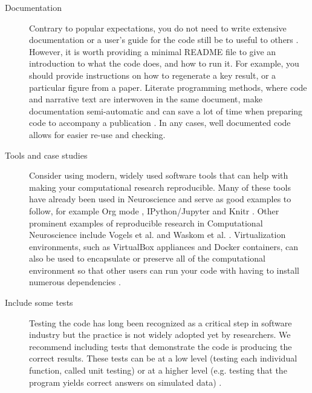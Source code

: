 \documentclass[11pt]{article}
\begin{document}
\begin{description}
\item [Documentation] Contrary to popular expectations, you do not
  need to write extensive documentation or a user's guide for the code
  still be to useful to others \cite{Barnes2010-iv}.  However, it is
  worth providing a minimal README file to give an introduction to
  what the code does, and how to run it.  For example, you should provide
  instructions on how to regenerate a key result, or a particular
  figure from a paper. Literate programming methods, where code and narrative text are interwoven in the same document, make documentation semi-automatic and can save a lot of time when preparing code to accompany a publication \cite{schulte2012multi, gentleman2012statistical}. In any cases, well documented code allows for easier re-use and checking.

\item [Tools and case studies] Consider using modern, widely used software tools that can help with making your computational research reproducible.  Many of
  these tools have already been used in Neuroscience and serve as good
  examples to follow, for example Org mode \cite{Delescluse2011},
  IPython/Jupyter \cite{Stevens2013} and Knitr \cite{Eglen2014}.  Other
  prominent examples of reproducible research in Computational
  Neuroscience include Vogels et al. \cite{Vogels2011-c8c} and Waskom et al. \cite{Waskom2014-gd}.
  Virtualization environments, such as VirtualBox appliances and
  Docker containers, can also be used to
  encapsulate or preserve all of the computational environment so that
  other users can run your code with having to install numerous dependencies \cite{Boettiger2015}.

\item [Include some tests] Testing the code has long been recognized
  as a critical step in software industry but the practice is not
  widely adopted yet by researchers. We recommend including tests that
  demonstrate the code is producing the correct
  results\cite{Axelrod2014-xi}. These tests can be at a low level
  (testing each individual function, called unit testing) or at a
  higher level (e.g. testing that the program yields correct answers
  on simulated data) \cite{wilson_best_2014}.

\end{description}
\end{document}
